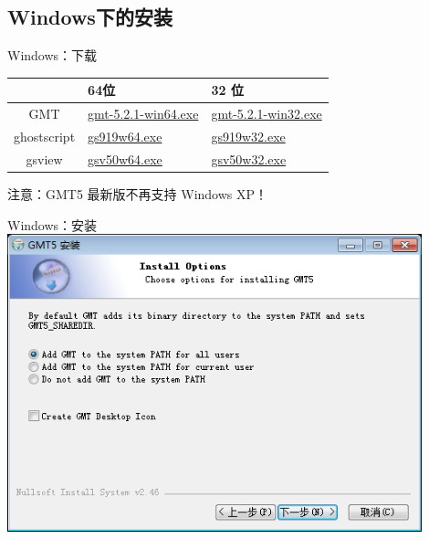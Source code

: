 \documentclass[UTF8, 11pt]{ctexbeamer}
\begin{document}
\subsection{Windows下的安装}
\begin{frame}{Windows：下载}
\begin{center}
\begin{tabular}{ c | l | l }
\hline
& 64位 & 32 位 \\
\hline
GMT & \href{http://mirrors.ustc.edu.cn/gmt/bin/gmt-5.2.1-win64.exe}{gmt-5.2.1-win64.exe} & \href{http://mirrors.ustc.edu.cn/gmt/bin/gmt-5.2.1-win32.exe}{gmt-5.2.1-win32.exe} \\
\hline
ghostscript & \href{https://github.com/ArtifexSoftware/ghostpdl-downloads/releases/download/gs919/gs919w64.exe}{gs919w64.exe} & \href{https://github.com/ArtifexSoftware/ghostpdl-downloads/releases/download/gs919/gs919w32.exe}{gs919w32.exe} \\
\hline
gsview & \href{http://pages.cs.wisc.edu/~ghost/gsview/download/gsv50w64.exe}{gsv50w64.exe} & \href{http://pages.cs.wisc.edu/~ghost/gsview/download/gsv50w32.exe}{gsv50w32.exe} \\
\hline
\end{tabular}
\end{center}

注意：GMT5 最新版不再支持 Windows XP！
\end{frame}
\begin{frame}{Windows：安装}
\centering
\includegraphics[width=0.9\textwidth]{GMT_win_install_1}
\end{frame}
\end{document}
